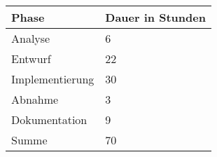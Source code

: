 \documentclass[fontsize=12pt,paper=a4,draft=off,titlepage=off]{scrartcl}
\begin{document}

\begin{table}[!htp]
    \centering
    \label{Übersicht Phasendauer}
    \begin{tabular}{ll}
        Phase           & Dauer in Stunden \\
        \hline
        Analyse         & 6  \\
        Entwurf         & 22 \\
        Implementierung & 30 \\
        Abnahme         & 3  \\
        Dokumentation   & 9  \\
        \hline
        Summe           & 70 \\
    \end{tabular}
\end{table}


\clearpage
\end{document}
